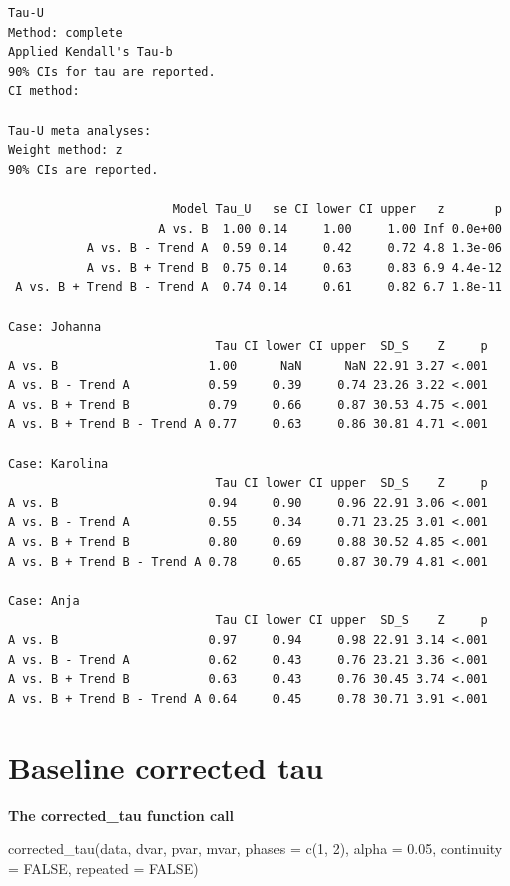 \documentclass[
  letterpaper,
  DIV=11,
  numbers=noendperiod]{scrreprt}
\begin{document}
\begin{verbatim}
Tau-U
Method: complete 
Applied Kendall's Tau-b
90% CIs for tau are reported.
CI method: 

Tau-U meta analyses:
Weight method: z
90% CIs are reported.

                       Model Tau_U   se CI lower CI upper   z       p
                     A vs. B  1.00 0.14     1.00     1.00 Inf 0.0e+00
           A vs. B - Trend A  0.59 0.14     0.42     0.72 4.8 1.3e-06
           A vs. B + Trend B  0.75 0.14     0.63     0.83 6.9 4.4e-12
 A vs. B + Trend B - Trend A  0.74 0.14     0.61     0.82 6.7 1.8e-11

Case: Johanna 
                             Tau CI lower CI upper  SD_S    Z     p
A vs. B                     1.00      NaN      NaN 22.91 3.27 <.001
A vs. B - Trend A           0.59     0.39     0.74 23.26 3.22 <.001
A vs. B + Trend B           0.79     0.66     0.87 30.53 4.75 <.001
A vs. B + Trend B - Trend A 0.77     0.63     0.86 30.81 4.71 <.001

Case: Karolina 
                             Tau CI lower CI upper  SD_S    Z     p
A vs. B                     0.94     0.90     0.96 22.91 3.06 <.001
A vs. B - Trend A           0.55     0.34     0.71 23.25 3.01 <.001
A vs. B + Trend B           0.80     0.69     0.88 30.52 4.85 <.001
A vs. B + Trend B - Trend A 0.78     0.65     0.87 30.79 4.81 <.001

Case: Anja 
                             Tau CI lower CI upper  SD_S    Z     p
A vs. B                     0.97     0.94     0.98 22.91 3.14 <.001
A vs. B - Trend A           0.62     0.43     0.76 23.21 3.36 <.001
A vs. B + Trend B           0.63     0.43     0.76 30.45 3.74 <.001
A vs. B + Trend B - Trend A 0.64     0.45     0.78 30.71 3.91 <.001
\end{verbatim}

\hypertarget{baseline-corrected-tau}{%
\section{Baseline corrected tau}\label{baseline-corrected-tau}}

\begin{tcolorbox}[enhanced jigsaw, breakable, rightrule=.15mm, bottomrule=.15mm, arc=.35mm, colback=white, colframe=quarto-callout-tip-color-frame, opacityback=0, leftrule=.75mm, toprule=.15mm, left=2mm]
\begin{minipage}[t]{5.5mm}
\textcolor{quarto-callout-tip-color}{\faLightbulb}
\end{minipage}%
\begin{minipage}[t]{\textwidth - 5.5mm}

\textbf{The corrected\_tau function call}\vspace{2mm}

corrected\_tau(data, dvar, pvar, mvar, phases = c(1, 2), alpha = 0.05,
continuity = FALSE, repeated = FALSE)

\end{minipage}%
\end{tcolorbox}
\end{document}
